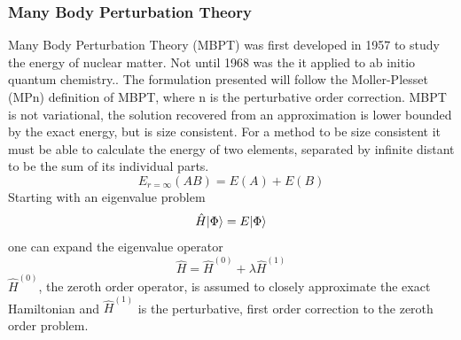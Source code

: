     \subsubsection{Many Body Perturbation Theory}
      Many Body Perturbation Theory (MBPT) was first developed in 1957\cite{Brueckner1957} to study the energy of nuclear matter. Not until 1968 was the it applied to ab initio quantum chemistry.\cite{Freed1968,Freed1971}. 
      The formulation presented will follow the M{\/o}ller-Plesset (MPn) definition of MBPT, where n is the perturbative order correction. 
      MBPT is not variational, the solution recovered from an approximation is lower bounded by the exact energy, but is size consistent.      %
      For a method to be size consistent it must be able to calculate the energy of two elements, separated by infinite distant to be the sum of its individual parts. 
        \begin{equation}
        	E_{r=\infty}(AB) = E(A) + E(B)
        \end{equation}
      Starting with an eigenvalue problem
        \begin{equation} \label{eigenvalue}
        	\hat{H}| \Phi \rangle =  E| \Phi \rangle
        \end{equation}
      one can expand the eigenvalue operator
      \begin{equation}\label{H_pert}
      	\hat{H} = \hat{H}^{(0)} + \lambda \hat{H}^{(1)}
      \end{equation}
      $\hat{H}^{(0)}$, the zeroth order operator, is assumed to closely approximate the exact Hamiltonian and $\hat{H}^{(1)}$ is the perturbative, first order correction to the zeroth order problem. 
